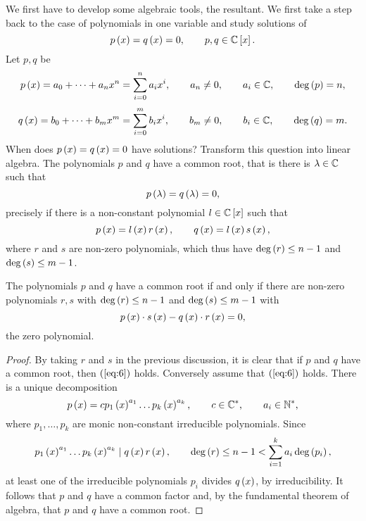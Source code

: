 We first have to develop some algebraic tools, the resultant. We first take a step back to the case of polynomials in one variable and study solutions of
$$ p\left( x \right) = q\left( x \right) = 0, \qquad p, q \in \mathbb{C}\left[ x \right]. $$
Let $ p, q $ be
$$ p\left( x \right) = a_0 + \dots + a_nx^n = \sum_{i = 0}^n a_ix^i, \qquad a_n \ne 0, \qquad a_i \in \mathbb{C}, \qquad \deg\left( p \right) = n, $$
$$ q\left( x \right) = b_0 + \dots + b_mx^m = \sum_{i = 0}^m b_ix^i, \qquad b_m \ne 0, \qquad b_i \in \mathbb{C}, \qquad \deg\left( q \right) = m. $$
When does $ p\left( x \right) = q\left( x \right) = 0 $ have solutions? Transform this question into linear algebra. The polynomials $ p $ and $ q $ have a common root, that is there is $ \lambda \in \mathbb{C} $ such that
$$ p\left( \lambda \right) = q\left( \lambda \right) = 0, $$
precisely if there is a non-constant polynomial $ l \in \mathbb{C}\left[ x \right] $ such that
$$ p\left( x \right) = l\left( x \right)r\left( x \right), \qquad q\left( x \right) = l\left( x \right)s\left( x \right), $$
where $ r $ and $ s $ are non-zero polynomials, which thus have $ \deg\left( r \right) \le n - 1 $ and $ \deg\left( s \right) \le m - 1 $.

\pagebreak

\begin{lemma}
\label{lem:9.1}
The polynomials $ p $ and $ q $ have a common root if and only if there are non-zero polynomials $ r, s $ with $ \deg\left( r \right) \le n - 1 $ and $ \deg\left( s \right) \le m - 1 $ with
\begin{equation}
\label{eq:6}
p\left( x \right) \cdot s\left( x \right) - q\left( x \right) \cdot r\left( x \right) = 0,
\end{equation}
the zero polynomial.
\end{lemma}

\begin{proof}
By taking $ r $ and $ s $ in the previous discussion, it is clear that if $ p $ and $ q $ have a common root, then $ \left( \ref{eq:6} \right) $ holds. Conversely assume that $ \left( \ref{eq:6} \right) $ holds. There is a unique decomposition
$$ p\left( x \right) = cp_1\left( x \right)^{a_1} \dots p_k\left( x \right)^{a_k}, \qquad c \in \mathbb{C}^*, \qquad a_i \in \mathbb{N}^*, $$
where $ p_1, \dots, p_k $ are monic non-constant irreducible polynomials. Since
$$ p_1\left( x \right)^{a_1} \dots p_k\left( x \right)^{a_k} \mid q\left( x \right)r\left( x \right), \qquad \deg\left( r \right) \le n - 1 < \sum_{i = 1}^k a_i \deg\left( p_i \right), $$
at least one of the irreducible polynomials $ p_i $ divides $ q\left( x \right) $, by irreducibility. It follows that $ p $ and $ q $ have a common factor and, by the fundamental theorem of algebra, that $ p $ and $ q $ have a common root.
\end{proof}

